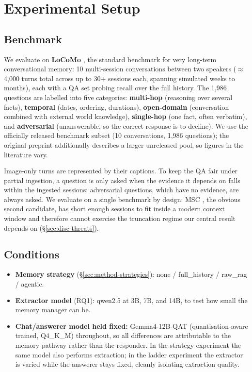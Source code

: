 \section{Experimental Setup}
\label{sec:setup}

\subsection{Benchmark}
\label{sec:setup-benchmark}

We evaluate on \textbf{LoCoMo} \citep{maharana2024locomo}, the standard benchmark for
very long-term conversational memory: 10 multi-session conversations between two
speakers ($\approx$4{,}000 turns total across up to 30+ sessions each, spanning simulated
weeks to months), each with a QA set probing recall over the full history. The
1{,}986 questions are labelled into five categories: \textbf{multi-hop} (reasoning over
several facts), \textbf{temporal} (dates, ordering, durations), \textbf{open-domain}
(conversation combined with external world knowledge),
\textbf{single-hop} (one fact, often verbatim), and \textbf{adversarial}
(unanswerable, so the correct response is to decline). We use the officially released benchmark
subset (10 conversations, 1{,}986 questions); the original preprint additionally
describes a larger unreleased pool, so figures in the literature vary.

Image-only turns are represented by their captions. To keep the QA fair under
partial ingestion, a question is only asked when the evidence it depends on
falls within the ingested sessions; adversarial questions, which have no
evidence, are always asked. We evaluate on a single benchmark by design: MSC
\citep{xu2022msc}, the obvious second candidate, has short enough sessions to fit
inside a modern context window and therefore cannot exercise the truncation
regime our central result depends on (\S\ref{sec:disc-threats}).

\subsection{Conditions}
\label{sec:setup-conditions}

\begin{itemize}
  \item \textbf{Memory strategy} (\S\ref{sec:method-strategies}): none / full\_history /
  raw\_rag / agentic.
  \item \textbf{Extractor model} (RQ1): qwen2.5 at 3B, 7B, and 14B, to test how small the
  memory manager can be.
  \item \textbf{Chat/answerer model held fixed:} Gemma4-12B-QAT (quantisation-aware
  trained, Q4\_K\_M) throughout, so all
  differences are attributable to the memory pathway rather than the responder.
  In the strategy experiment the same model also performs extraction; in the
  ladder experiment the extractor is varied while the answerer stays fixed,
  cleanly isolating extraction quality.
\end{itemize}

